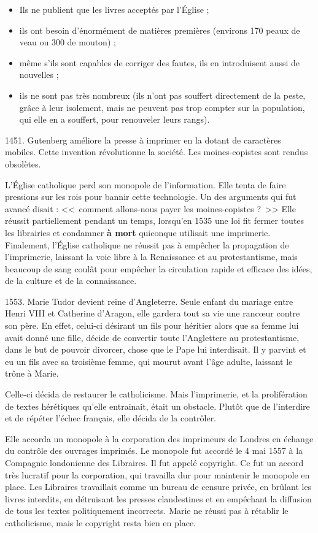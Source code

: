 \begin{itemize}
\item Ils ne publient que les livres acceptés par l'Église ;
\item ils ont besoin d'énormément de matières premières (environs 170 peaux de veau ou 300 de mouton) ;
\item même s'ils sont capables de corriger des fautes, ils en introduisent aussi de nouvelles ;
\item ils ne sont pas très nombreux (ils n'ont pas souffert directement de la peste, grâce à leur isolement, mais ne peuvent pas trop compter sur la population, qui elle en a souffert, pour renouveler leurs rangs).
\end{itemize}

1451.
Gutenberg améliore la presse à imprimer en la dotant de caractères mobiles.
Cette invention révolutionne la société.
Les moines-copistes sont rendus obsolètes.

L'Église catholique perd son monopole de l'information.
Elle tenta de faire pressions sur les rois pour bannir cette technologie.
Un des arguments qui fut avancé disait : <<~comment allons-nous payer les moines-copistes ?~>>
Elle réussit partiellement pendant un temps, lorsqu'en 1535 une loi fit fermer toutes les librairies et condamner \textbf{à mort} quiconque utilisait une imprimerie.
Finalement, l'Église catholique ne réussit pas à empêcher la propagation de l'imprimerie, laissant la voie libre à la Renaissance et au protestantisme, mais beaucoup de sang coulât pour empêcher la circulation rapide et efficace des idées, de la culture et de la connaissance.

1553.
Marie Tudor devient reine d'Angleterre.
Seule enfant du mariage entre Henri VIII et Catherine d'Aragon, elle gardera tout sa vie une rancœur contre son père.
En effet, celui-ci désirant un fils pour héritier alors que sa femme lui avait donné une fille, décide de convertir toute l'Anglettere au protestantisme, dans le but de pouvoir divorcer, chose que le Pape lui interdisait.
Il y parvint et eu un fils avec sa troisième femme, qui mourut avant l'âge adulte, laissant le trône à Marie.

Celle-ci décida de restaurer le catholicisme.
Mais l'imprimerie, et la prolifération de textes hérétiques qu'elle entrainait, était un obstacle.
Plutôt que de l'interdire et de répéter l'échec français, elle décida de la contrôler.

Elle accorda un monopole à la corporation des imprimeurs de Londres en échange du contrôle des ouvrages imprimés.
Le monopole fut accordé le 4 mai 1557 à la Compagnie londonienne des Libraires. Il fut appelé copyright.
Ce fut un accord très lucratif pour la corporation, qui travailla dur pour maintenir le monopole en place.
Les Libraires travaillait comme un bureau de censure privée, en brûlant les livres interdits, en détruisant les presses clandestines et en empêchant la diffusion de tous les textes politiquement incorrects.
Marie ne réussi pas à rétablir le catholicisme, mais le copyright resta bien en place.

